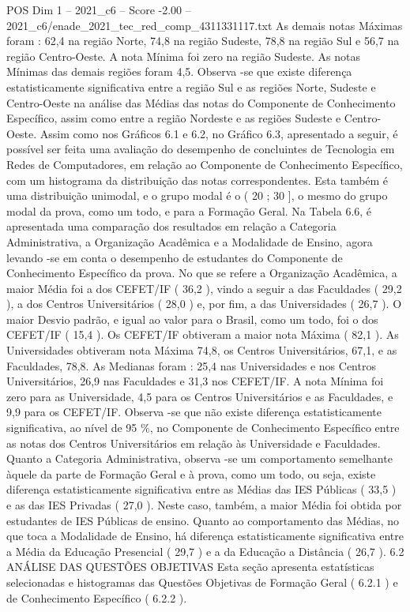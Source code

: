 \begin{textsample}{POS Dim 1 – 2021\_c6 – Score -2.00 – 2021\_c6/enade\_2021\_tec\_red\_comp\_4311331117.txt}
As demais notas Máximas foram : 62,4 na região Norte, 74,8 na região Sudeste, 78,8 na região Sul e 56,7 na região Centro-Oeste.
A nota Mínima foi zero na região Sudeste.
As notas Mínimas das demais regiões foram 4,5.
Observa -se que existe diferença estatisticamente significativa entre a região Sul e as regiões Norte, Sudeste e Centro-Oeste na análise das Médias das notas do Componente de Conhecimento Específico, assim como entre a região Nordeste e as regiões Sudeste e Centro-Oeste.
Assim como nos Gráficos 6.1 e 6.2, no Gráfico 6.3, apresentado a seguir, é possível ser feita uma avaliação do desempenho de concluintes de Tecnologia em Redes de Computadores, em relação ao Componente de Conhecimento Específico, com um histograma da distribuição das notas correspondentes.
Esta também é uma distribuição unimodal, e o grupo modal é o ( 20 ; 30 ], o mesmo do grupo modal da prova, como um todo, e para a Formação Geral.
Na Tabela 6.6, é apresentada uma comparação dos resultados em relação a Categoria Administrativa, a Organização Acadêmica e a Modalidade de Ensino, agora levando -se em conta o desempenho de estudantes do Componente de Conhecimento Específico da prova.
No que se refere a Organização Acadêmica, a maior Média foi a dos CEFET/IF ( 36,2 ), vindo a seguir a das Faculdades ( 29,2 ), a dos Centros Universitários ( 28,0 ) e, por fim, a das Universidades ( 26,7 ).
O maior Desvio padrão, e igual ao valor para o Brasil, como um todo, foi o dos CEFET/IF ( 15,4 ).
Os CEFET/IF obtiveram a maior nota Máxima ( 82,1 ).
As Universidades obtiveram nota Máxima 74,8, os Centros Universitários, 67,1, e as Faculdades, 78,8.
As Medianas foram : 25,4 nas Universidades e nos Centros Universitários, 26,9 nas Faculdades e 31,3 nos CEFET/IF.
A nota Mínima foi zero para as Universidade, 4,5 para os Centros Universitários e as Faculdades, e 9,9 para os CEFET/IF.
Observa -se que não existe diferença estatisticamente significativa, ao nível de 95 \%, no Componente de Conhecimento Específico entre as notas dos Centros Universitários em relação às Universidade e Faculdades.
Quanto a Categoria Administrativa, observa -se um comportamento semelhante àquele da parte de Formação Geral e à prova, como um todo, ou seja, existe diferença estatisticamente significativa entre as Médias das IES Públicas ( 33,5 ) e as das IES Privadas ( 27,0 ).
Neste caso, também, a maior Média foi obtida por estudantes de IES Públicas de ensino.
Quanto ao comportamento das Médias, no que toca a Modalidade de Ensino, há diferença estatisticamente significativa entre a Média da Educação Presencial ( 29,7 ) e a da Educação a Distância ( 26,7 ). 6.2 ANÁLISE DAS QUESTÕES OBJETIVAS Esta seção apresenta estatísticas selecionadas e histogramas das Questões Objetivas de Formação Geral ( 6.2.1 ) e de Conhecimento Específico ( 6.2.2 ).

\end{textsample}
